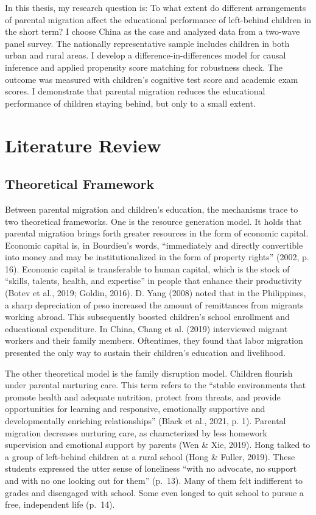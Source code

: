 \documentclass[
  man,floatsintext]{apa7}
\begin{document}
In this thesis, my research question is: To what extent do different arrangements of parental migration affect the educational performance of left-behind children in the short term? I choose China as the case and analyzed data from a two-wave panel survey. The nationally representative sample includes children in both urban and rural areas. I develop a difference-in-differences model for causal inference and applied propensity score matching for robustness check. The outcome was measured with children's cognitive test score and academic exam scores. I demonstrate that parental migration reduces the educational performance of children staying behind, but only to a small extent.

\newpage

\hypertarget{literature-review}{%
\section{Literature Review}\label{literature-review}}

\hypertarget{theoretical-framework}{%
\subsection{Theoretical Framework}\label{theoretical-framework}}

Between parental migration and children's education, the mechanisms trace to two theoretical frameworks. One is the resource generation model. It holds that parental migration brings forth greater resources in the form of economic capital. Economic capital is, in Bourdieu's words, ``immediately and directly convertible into money and may be institutionalized in the form of property rights'' (2002, p. 16). Economic capital is transferable to human capital, which is the stock of ``skills, talents, health, and expertise'' in people that enhance their productivity (Botev et al., 2019; Goldin, 2016). D. Yang (2008) noted that in the Philippines, a sharp depreciation of peso increased the amount of remittances from migrants working abroad. This subsequently boosted children's school enrollment and educational expenditure. In China, Chang et al. (2019) interviewed migrant workers and their family members. Oftentimes, they found that labor migration presented the only way to sustain their children's education and livelihood.

The other theoretical model is the family disruption model. Children flourish under parental nurturing care. This term refers to the ``stable environments that promote health and adequate nutrition, protect from threats, and provide opportunities for learning and responsive, emotionally supportive and developmentally enriching relationships'' (Black et al., 2021, p. 1). Parental migration decreases nurturing care, as characterized by less homework supervision and emotional support by parents (Wen \& Xie, 2019). Hong talked to a group of left-behind children at a rural school (Hong \& Fuller, 2019). These students expressed the utter sense of loneliness ``with no advocate, no support and with no one looking out for them'' (p.~13). Many of them felt indifferent to grades and disengaged with school. Some even longed to quit school to pursue a free, independent life (p.~14).
\end{document}
